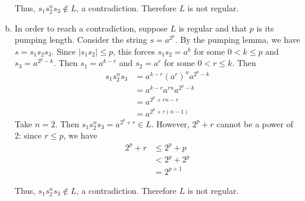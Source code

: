 \begin{solution}
\begin{enumerate}[(a)]
    Thus, $s_1s_2^ns_3\not\in L$, a contradiction. Therefore $L$ is not regular.
    \item In order to reach a contradiction, suppose $L$ is regular and that $p$ is its pumping length. Consider the string $s=a^{2^p}$. By the pumping lemma, we have $s=s_1s_2s_3$. Since $|s_1s_2|\leq p$, this forces $s_1s_2=a^k$ for some $0<k\leq p$ and $s_3=a^{2^p-k}$. Then $s_1=a^{k-r}$ and $s_2=a^r$ for some $0<r\leq k$. Then
    \begin{align*}
        s_1s_2^ns_3 &= a^{k-r}(a^r)^na^{2^p-k}\\
                    &= a^{k-r}a^{rn}a^{2^p-k}\\
                    &= a^{2^p+rn-r}\\
                    &= a^{2^p+r(n-1)}
    \end{align*}
    Take $n=2$. Then $s_1s_2^ns_3=a^{2^p+r}\in L$. However, $2^p+r$ cannot be a power of 2: since $r \leq p$, we have 
    \begin{align*}
        2^p+r &\leq 2^p + p\\
              &< 2^p + 2^p\\
              &= 2^{p+1}
    \end{align*}
    
    Thus, $s_1s_2^ns_3\not\in L$, a contradiction. Therefore $L$ is not regular.
\end{enumerate}
    
\end{solution}